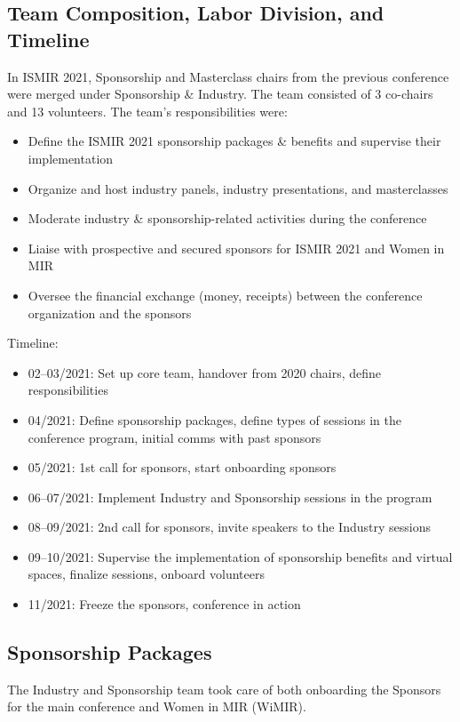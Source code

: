 \documentclass[%
10pt,								%
]
{scrartcl}
\begin{document}
    \subsection{Team Composition, Labor Division, and Timeline}
        In ISMIR 2021, Sponsorship and Masterclass chairs from the previous conference were merged under Sponsorship \& Industry. The team consisted of 3 co-chairs and 13 volunteers. The team's responsibilities were:
        \begin{itemize}
            \item Define the ISMIR 2021 sponsorship packages \& benefits and supervise their implementation
            \item Organize and host industry panels, industry presentations, and masterclasses
            \item Moderate industry \& sponsorship-related activities during the conference
            \item Liaise with prospective and secured sponsors for ISMIR 2021 and Women in MIR
            \item Oversee the financial exchange (money, receipts) between the conference organization and the sponsors
        \end{itemize}
        Timeline:
        \begin{itemize}
            \item 02--03/2021: Set up core team, handover from 2020 chairs, define responsibilities
            \item 04/2021: Define sponsorship packages, define types of sessions in the conference program, initial comms with past sponsors
            \item 05/2021: 1st call for sponsors, start onboarding sponsors
            \item 06--07/2021: Implement Industry and Sponsorship sessions in the program
            \item 08--09/2021: 2nd call for sponsors, invite speakers to the Industry sessions 
            \item 09--10/2021: Supervise the implementation of sponsorship benefits and virtual spaces, finalize sessions, onboard volunteers
            \item 11/2021: Freeze the sponsors, conference in action 
        \end{itemize}
        
        
    \subsection{Sponsorship Packages}
        The Industry and Sponsorship team took care of both onboarding the Sponsors for the main conference and Women in MIR (WiMIR).
\end{document}
